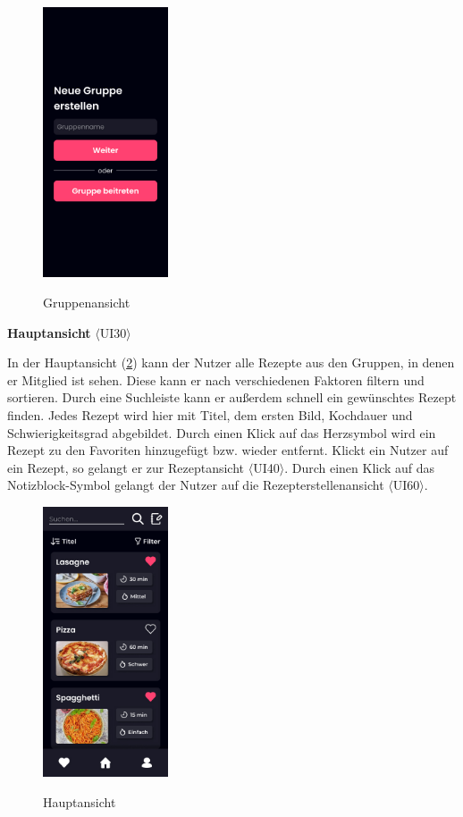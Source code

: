 \documentclass[parskip=full]{scrartcl}
\begin{document}
\begin{figure}[!htp]
    \centering
    \includegraphics[height=80mm]{images/section7/GroupView.jpg}
    \label{fig:A73}
    \caption{Gruppenansicht}
\end{figure}
\newpage
\textbf{Hauptansicht} $\langle$UI30$\rangle$

In der Hauptansicht (\ref{fig:A74}) kann der Nutzer alle Rezepte aus den Gruppen, in denen er Mitglied ist sehen. Diese kann er nach verschiedenen Faktoren filtern und sortieren. Durch eine Suchleiste kann er außerdem schnell ein gewünschtes Rezept finden. Jedes Rezept wird hier mit Titel, dem ersten Bild, Kochdauer und Schwierigkeitsgrad abgebildet. Durch einen Klick auf das Herzsymbol wird ein Rezept zu den Favoriten hinzugefügt bzw. wieder entfernt. Klickt ein Nutzer auf ein Rezept, so gelangt er zur Rezeptansicht $\langle$UI40$\rangle$. Durch einen Klick auf das Notizblock-Symbol gelangt der Nutzer auf die Rezepterstellenansicht $\langle$UI60$\rangle$.

\begin{figure}[!htp]
    \centering
    \includegraphics[height=80mm]{images/section7/MainView.jpg}
    \label{fig:A74}
    \caption{Hauptansicht}
\end{figure}
\end{document}

